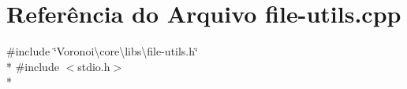 \section{Referência do Arquivo file-\/utils.cpp}
\label{file-utils_8cpp}
{\ttfamily \#include \char`\"{}Voronoi\textbackslash{}core\textbackslash{}libs\textbackslash{}file-\/utils.\+h\char`\"{}}\\*
{\ttfamily \#include $<$stdio.\+h$>$}\\*
